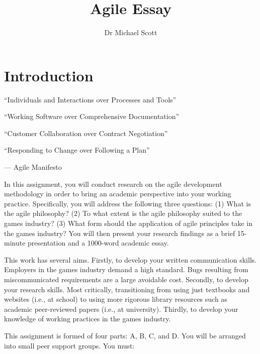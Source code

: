 \documentclass{../fal_assignment}
\title{Agile Essay}
\author{Dr Michael Scott}
\begin{document}
\maketitle

\section*{Introduction}

\begin{marginquote}
  ``Individuals and Interactions over Processes and Tools''
  
  ``Working Software over Comprehensive Documentation''
  
  ``Customer Collaboration over Contract Negotiation''
  
  ``Responding to Change over Following a Plan''
    
    --- Agile Manifesto
\end{marginquote}

In this assignment, you will conduct research on the agile development methodology in order to bring an academic perspective into your working practice. Specifically, you will address the following three questions: (1) What is the agile philosophy? (2) To what extent is the agile philosophy suited to the games industry? (3) What form should the application of agile principles take in the games industry? You will then present your research findings as a brief 15-minute presentation and a 1000-word academic essay.

This work has several aims. Firstly, to develop your written communication skills. Employers in the games industry demand a high standard. Bugs resulting from miscommunicated requirements are a large avoidable cost. Secondly, to develop your research skills. Most critically, transitioning from using just textbooks and websites (i.e., at school) to using more rigorous library resources such as academic peer-reviewed papers (i.e., at university). Thirdly, to develop your knowledge of working practices in the games industry.

This assignment is formed of four parts: A, B, C, and D. You will be arranged into small peer support groups. You must:
\end{document}
